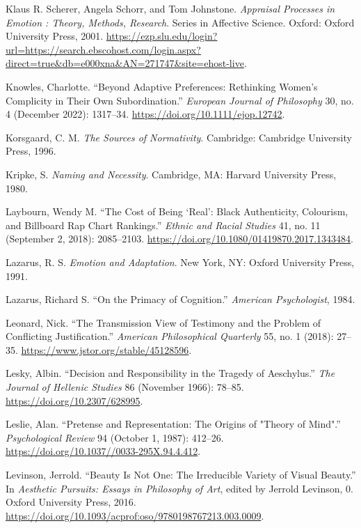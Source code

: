 \documentclass[phdthesis,12pt,final]{wuthesis}
\newlength{\cslhangindent}
\newenvironment{CSLReferences}[2] %
{\begin{list}{}{%
	\setlength{\itemindent}{0pt}
	\setlength{\leftmargin}{0pt}
	\setlength{\parsep}{0pt}
	\ifodd #1
	\setlength{\leftmargin}{\cslhangindent}
	\setlength{\itemindent}{-1\cslhangindent}
	\fi
	\setlength{\itemsep}{#2\baselineskip}}}
{\end{list}}
\theoremstyle{definition}
\theoremstyle{definition}
\theoremstyle{definition}
\theoremstyle{definition}
\theoremstyle{remark}
\begin{document}
\begin{CSLReferences}{1}{0}
Klaus R. Scherer, Angela Schorr, and Tom Johnstone. \emph{Appraisal {Processes} in {Emotion} : {Theory}, {Methods}, {Research}}. Series in {Affective Science}. Oxford: Oxford University Press, 2001. \url{https://ezp.slu.edu/login?url=https://search.ebscohost.com/login.aspx?direct=true&db=e000xna&AN=271747&site=ehost-live}.

Knowles, Charlotte. {``Beyond Adaptive Preferences: {Rethinking} Women's Complicity in Their Own Subordination.''} \emph{European Journal of Philosophy} 30, no. 4 (December 2022): 1317--34. \url{https://doi.org/10.1111/ejop.12742}.

Korsgaard, C. M. \emph{The Sources of Normativity}. Cambridge: Cambridge University Press, 1996.

Kripke, S. \emph{Naming and Necessity}. Cambridge, MA: Harvard University Press, 1980.

Laybourn, Wendy M. {``The Cost of Being {`Real'}: Black Authenticity, Colourism, and {Billboard Rap Chart} Rankings.''} \emph{Ethnic and Racial Studies} 41, no. 11 (September 2, 2018): 2085--2103. \url{https://doi.org/10.1080/01419870.2017.1343484}.

Lazarus, R. S. \emph{Emotion and Adaptation}. New York, NY: Oxford University Press, 1991.

Lazarus, Richard S. {``On the {Primacy} of {Cognition}.''} \emph{American Psychologist}, 1984.

Leonard, Nick. {``The {Transmission View} of {Testimony} and the {Problem} of {Conflicting Justification}.''} \emph{American Philosophical Quarterly} 55, no. 1 (2018): 27--35. \url{https://www.jstor.org/stable/45128596}.

Lesky, Albin. {``Decision and {Responsibility} in the {Tragedy} of {Aeschylus}.''} \emph{The Journal of Hellenic Studies} 86 (November 1966): 78--85. \url{https://doi.org/10.2307/628995}.

Leslie, Alan. {``Pretense and {Representation}: {The Origins} of "{Theory} of {Mind}".''} \emph{Psychological Review} 94 (October 1, 1987): 412--26. \url{https://doi.org/10.1037//0033-295X.94.4.412}.

Levinson, Jerrold. {``Beauty Is {Not One}: {The Irreducible Variety} of {Visual Beauty}.''} In \emph{Aesthetic {Pursuits}: {Essays} in {Philosophy} of {Art}}, edited by Jerrold Levinson, 0. Oxford University Press, 2016. \url{https://doi.org/10.1093/acprof:oso/9780198767213.003.0009}.


\end{CSLReferences}
\end{document}
